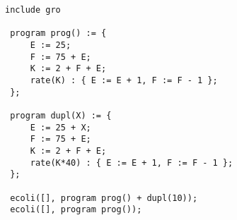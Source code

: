 \begin{lstlisting}[style=GROSRC, caption=Example gro code.]
 include gro

 program prog() := {
     E := 25;
     F := 75 + E;
     K := 2 + F + E;
     rate(K) : { E := E + 1, F := F - 1 };
 };

 program dupl(X) := {
     E := 25 + X;
     F := 75 + E;
     K := 2 + F + E;
     rate(K*40) : { E := E + 1, F := F - 1 };
 };

 ecoli([], program prog() + dupl(10));
 ecoli([], program prog());
\end{lstlisting}